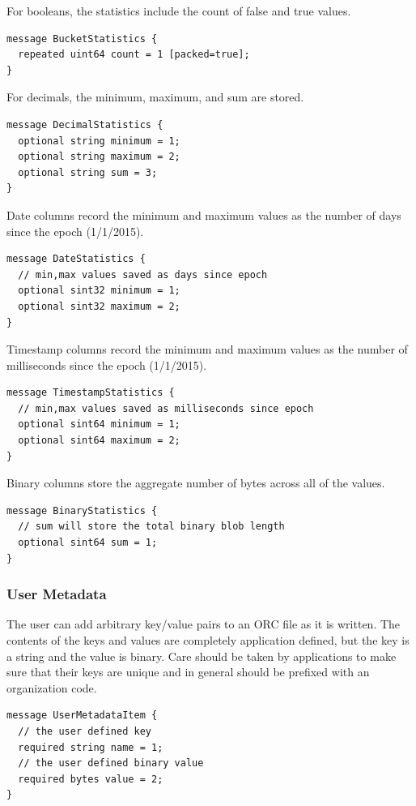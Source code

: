 \documentclass{article}
\begin{document}
For booleans, the statistics include the count of false and true values.

\begin{verbatim}
message BucketStatistics {
  repeated uint64 count = 1 [packed=true];
}
\end{verbatim}

For decimals, the minimum, maximum, and sum are stored.

\begin{verbatim}
message DecimalStatistics {
  optional string minimum = 1;
  optional string maximum = 2;
  optional string sum = 3;
}
\end{verbatim}

Date columns record the minimum and maximum values as the number of days since
the epoch (1/1/2015).

\begin{verbatim}
message DateStatistics {
  // min,max values saved as days since epoch
  optional sint32 minimum = 1;
  optional sint32 maximum = 2;
}
\end{verbatim}

Timestamp columns record the minimum and maximum values as the number of
milliseconds since the epoch (1/1/2015).

\begin{verbatim}
message TimestampStatistics {
  // min,max values saved as milliseconds since epoch
  optional sint64 minimum = 1;
  optional sint64 maximum = 2;
}
\end{verbatim}

Binary columns store the aggregate number of bytes across all of the values.

\begin{verbatim}
message BinaryStatistics {
  // sum will store the total binary blob length
  optional sint64 sum = 1;
}
\end{verbatim}

\subsubsection{User Metadata}

The user can add arbitrary key/value pairs to an ORC file as it is
written. The contents of the keys and values are completely
application defined, but the key is a string and the value is
binary. Care should be taken by applications to make sure that their
keys are unique and in general should be prefixed with an organization
code.

\begin{verbatim}
message UserMetadataItem {
  // the user defined key
  required string name = 1;
  // the user defined binary value
  required bytes value = 2;
}
\end{verbatim}
\end{document}
